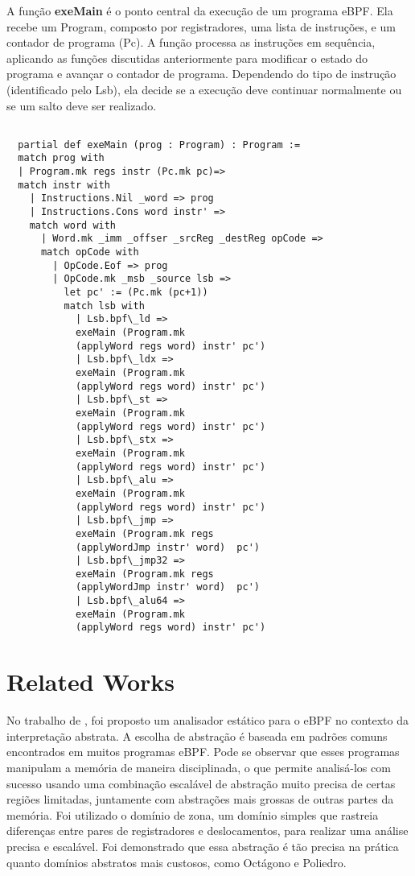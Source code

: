 \documentclass[sigconf]{acmart}
\begin{document}
A função \textbf{exeMain} é o ponto central da execução de um programa eBPF. Ela recebe um Program, composto por registradores, uma lista de instruções, e um contador de programa (Pc). A função processa as instruções em sequência, aplicando as funções discutidas anteriormente para modificar o estado do programa e avançar o contador de programa. Dependendo do tipo de instrução (identificado pelo Lsb), ela decide se a execução deve continuar normalmente ou se um salto deve ser realizado.

\begin{center}
\begin{verbatim}
        
  partial def exeMain (prog : Program) : Program :=
  match prog with
  | Program.mk regs instr (Pc.mk pc)=>
  match instr with
    | Instructions.Nil _word => prog
    | Instructions.Cons word instr' =>
    match word with
      | Word.mk _imm _offser _srcReg _destReg opCode =>
      match opCode with
        | OpCode.Eof => prog
        | OpCode.mk _msb _source lsb =>
          let pc' := (Pc.mk (pc+1))
          match lsb with
            | Lsb.bpf\_ld => 
            exeMain (Program.mk 
            (applyWord regs word) instr' pc')
            | Lsb.bpf\_ldx => 
            exeMain (Program.mk 
            (applyWord regs word) instr' pc')
            | Lsb.bpf\_st => 
            exeMain (Program.mk 
            (applyWord regs word) instr' pc') 
            | Lsb.bpf\_stx =>
            exeMain (Program.mk 
            (applyWord regs word) instr' pc')
            | Lsb.bpf\_alu => 
            exeMain (Program.mk 
            (applyWord regs word) instr' pc')
            | Lsb.bpf\_jmp =>
            exeMain (Program.mk regs 
            (applyWordJmp instr' word)  pc')
            | Lsb.bpf\_jmp32 =>
            exeMain (Program.mk regs 
            (applyWordJmp instr' word)  pc')
            | Lsb.bpf\_alu64 =>
            exeMain (Program.mk 
            (applyWord regs word) instr' pc')

\end{verbatim}
\end{center}


\section{Related Works}

No trabalho de \cite{gershuni2019simple}, foi proposto um analisador estático para o eBPF no contexto da interpretação abstrata. A escolha de abstração é baseada em padrões comuns encontrados em muitos programas eBPF. Pode se observar que esses programas manipulam a memória de maneira disciplinada, o que permite analisá-los com sucesso usando uma combinação escalável de abstração muito precisa de certas regiões limitadas, juntamente com abstrações mais grossas de outras partes da memória. Foi utilizado o domínio de zona, um domínio simples que rastreia diferenças entre pares de registradores e deslocamentos, para realizar uma análise precisa e escalável. Foi demonstrado que essa abstração é tão precisa na prática quanto domínios abstratos mais custosos, como Octágono e Poliedro.
\end{document}

